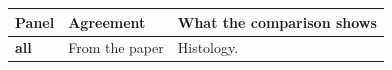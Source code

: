 \begin{longtable}{@{}p{1.1cm}p{2.5cm}p{11.8cm}@{}}
\toprule
Panel & Agreement & What the comparison shows \\
\midrule
\endhead
\textbf{all} & From the paper & Histology. \\
\bottomrule
\end{longtable}

